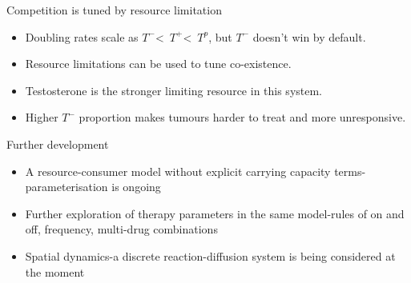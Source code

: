 \documentclass{beamer}
\begin{document}
\begin{frame}{Competition is tuned by resource limitation}
\begin{itemize}
	\item<1-> Doubling rates scale as $T^-$<\ $T^+$<\ $T^p$, but $T^-$ doesn't win by default.
	\item<1-> Resource limitations can be used to tune co-existence.
	\item<2-> Testosterone is the stronger limiting resource in this system.
	\item<3-> Higher $T^-$ proportion makes tumours harder to treat and more unresponsive.
\end{itemize}
\end{frame}

\begin{frame}{Further development}
	\begin{itemize}
		\item<1-> A resource-consumer model without explicit carrying capacity terms-parameterisation is ongoing
		\item<2-> Further exploration of therapy parameters in the same model-rules of on and off, frequency, multi-drug combinations
		\item<3-> Spatial dynamics-a discrete reaction-diffusion system is being considered at the moment
	\end{itemize}
\end{frame}
\end{document}
